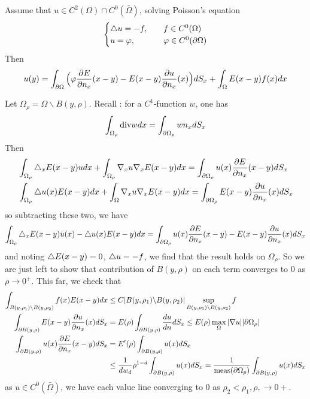 \documentclass[12pt,a4paper]{article}
\newenvironment{proof}
{\begin{changemargin}{1cm}{0.5cm} 
	}%
	{\end{changemargin}
}
\begin{document}
 Assume that $u\in C^2(\Omega)\cap C^0(\bar{\Omega})$, solving Poisson's equation
\begin{align*}
\begin{cases}
\triangle u = - f, \quad &f \in C^0(\Omega)\\
u = \varphi, \quad &\varphi \in C^0(\partial \Omega)
\end{cases}
\end{align*}
Then
\begin{align*}
u(y) = \int_{\partial \Omega} \Big( \varphi\frac{\partial E}{\partial n_x}(x-y) - E(x-y)\frac{\partial u}{\partial n_x}(x) \Big) dS_x + \int_{\Omega} E(x-y) f(x) dx
\end{align*}
\begin{proof}
\pf Let $\Omega_{\rho} = \Omega \backslash B(y, \rho)$. Recall : for a $C^1$-function $w$, one has
\begin{align*}
\int_{\Omega_{\rho}}\text{div} w dx = \int_{\partial \Omega_{\rho}} wn_x dS_x
\end{align*}
Then
\begin{align*}
&\int_{\Omega_{\rho}} \triangle_x E(x-y) udx + \int_{\Omega_{\rho}} \nabla_x u\nabla_x E(x-y) dx = \int_{\partial \Omega_{\rho}} u(x)\frac{\partial E}{\partial n_x} (x-y) dS_x\\
& \int_{\Omega_{\rho}} \triangle u(x) E(x-y) dx + \int_{\Omega} \nabla_x u \nabla_x E(x-y) dx = \int_{\partial \Omega_{\rho}}E(x-y) \frac{\partial u}{\partial n_x}(x) dS_x
\end{align*}
so subtracting these two, we have
\begin{align*}
\int_{\Omega_{\rho}} \triangle_x E(x-y) u(x) - \triangle u(x)E(x-y) dx = \int_{\partial \Omega_{\rho}} u(x)\frac{\partial E}{\partial n_x} (x-y) - E(x-y)\frac{\partial u}{\partial n_x}(x) dS_x
\end{align*}
and noting $\triangle E(x-y) =0$, $\triangle u = -f$, we find that the result holds on $\Omega_{\rho}$. So we are just left to show that contribution of $B(y, \rho)$ on each term converges to 0 as $\rho \rightarrow 0^+$. This far, we check that
\begin{align*}
\int_{B(y, \rho_1)\backslash B(y, \rho_2)} f(x)E(x-y) dx &\leq C |B(y, \rho_1)\backslash B(y, \rho_2)| \sup_{B(y, \rho_1)\backslash B(y, \rho_2)} f \\
\int_{\partial B(y,\rho)} E(x-y) \frac{\partial u}{\partial n_x}(x)dS_x &= E(\rho) \int_{\partial B(y, \rho)} \frac{du}{dn} dS_x \leq   E(\rho) \max_{\Omega} |\nabla u| |\partial \Omega_{\rho}| \\
\int_{\partial B(y, \rho)} u(x) \frac{\partial E}{\partial n_x}(x-y) dS_x &= E'(\rho)\int_{\partial B(y, \rho)} u(x)dS_x\\
& \leq \frac{1}{dw_d} \rho^{1-d} \int_{\partial B(y, \rho)} u(x)dS_x = \frac{1}{\text{meas}(\partial \Omega_p)} \int_{\partial B(y, \rho)} u(x)dS_x
\end{align*}
as $u\in C^0(\bar{\Omega})$, we have each value line converging to 0 as $\rho_2 <\rho_1, \rho, \rightarrow 0+$.

\eop 
\end{proof}
\s
\end{document}

